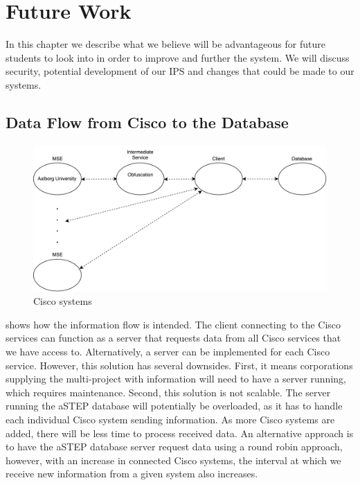 \chapter{Future Work}
\label{Cha:Future_Work}
In this chapter we describe what we believe will be advantageous for future students to look into in order to improve and further the system. 
We will discuss security, potential development of our IPS and changes that could be made to our systems. 

\section{Data Flow from Cisco to the Database}\label{sec:data_flow}
\begin{figure}[ht]
	\begin{center}
		\includegraphics[scale=0.5]{graphics/ciscoNew.pdf}
		\caption{Cisco systems}
		\label{fig:cisco_systems}
	\end{center} 
\end{figure}
 shows how the information flow is intended. The client connecting to the Cisco services can function as a server that requests data from all Cisco services that we have access to. Alternatively, a server can be implemented for each Cisco service. However, this solution has several downsides. First, it means corporations supplying the multi-project with information will need to have a server running, which requires maintenance. Second, this solution is not scalable. The server running the aSTEP database will potentially be overloaded, as it has to handle each individual Cisco system sending information. As more Cisco systems are added, there will be less time to process received data. An alternative approach is to have the aSTEP database server request data using a round robin approach, however, with an increase in connected Cisco systems, the interval at which we receive new information from a given system also increases.

